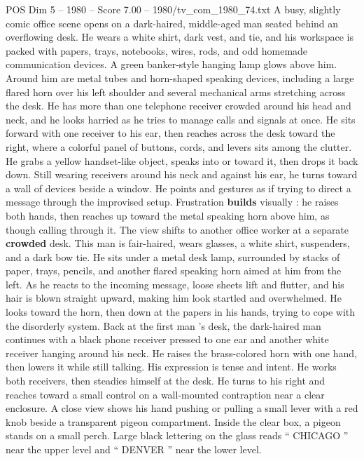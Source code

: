 \begin{textsample}{POS Dim 5 – 1980 – Score 7.00 – 1980/tv\_com\_1980\_74.txt}  \label{ex:f5_pos_035}
A busy, slightly comic office scene opens on a dark-haired, middle-aged man seated behind an overflowing desk.
He wears a white shirt, dark vest, and tie, and his workspace is packed with papers, trays, notebooks, wires, rods, and odd homemade communication devices.
A green banker-style hanging lamp glows above him.
Around him are metal tubes and horn-shaped speaking devices, including a large flared horn over his left shoulder and several mechanical arms stretching across the desk.
He has more than one telephone receiver crowded around his head and neck, and he looks harried as he tries to manage calls and signals at once.
He sits forward with one receiver to his ear, then reaches across the desk toward the right, where a colorful panel of buttons, cords, and levers sits among the clutter.
He grabs a yellow handset-like object, speaks into or toward it, then drops it back down.
Still wearing receivers around his neck and against his ear, he turns toward a wall of devices beside a window.
He points and gestures as if trying to direct a message through the improvised setup.
Frustration \textbf{builds} visually : he raises both hands, then reaches up toward the metal speaking horn above him, as though calling through it.
The view shifts to another office worker at a separate \textbf{crowded} desk.
This man is fair-haired, wears glasses, a white shirt, suspenders, and a dark bow tie.
He sits under a metal desk lamp, surrounded by stacks of paper, trays, pencils, and another flared speaking horn aimed at him from the left.
As he reacts to the incoming message, loose sheets lift and flutter, and his hair is blown straight upward, making him look startled and overwhelmed.
He looks toward the horn, then down at the papers in his hands, trying to cope with the disorderly system.
Back at the first man ’s desk, the dark-haired man continues with a black phone receiver pressed to one ear and another white receiver hanging around his neck.
He raises the brass-colored horn with one hand, then lowers it while still talking.
His expression is tense and intent.
He works both receivers, then steadies himself at the desk.
He turns to his right and reaches toward a small control on a wall-mounted contraption near a clear enclosure.
A close view shows his hand pushing or pulling a small lever with a red knob beside a transparent pigeon compartment.
Inside the clear box, a pigeon stands on a small perch.
Large black lettering on the glass reads “ CHICAGO ” near the upper level and “ DENVER ” near the lower level.

\end{textsample}
